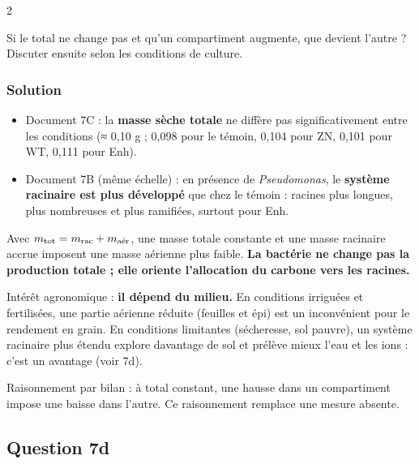 \documentclass[11pt,a4paper]{article}
\providecommand{\tightlist}{\setlength{\itemsep}{0pt}\setlength{\parskip}{0pt}}
\begin{document}
\begin{indication}{2}

Si le total ne change pas et qu'un compartiment augmente, que devient l'autre ? Discuter ensuite selon les conditions de culture.

\end{indication}

\hypertarget{solution-17}{%
\subsubsection{Solution}\label{solution-17}}

\begin{itemize}
\tightlist
\item
  Document 7C : la \textbf{masse sèche totale} ne diffère pas significativement entre les conditions (≈ 0,10 g ; 0,098 pour le témoin, 0,104 pour ZN, 0,101 pour WT, 0,111 pour Enh).
\item
  Document 7B (même échelle) : en présence de \emph{Pseudomonas}, le \textbf{système racinaire est plus développé} que chez le témoin : racines plus longues, plus nombreuses et plus ramifiées, surtout pour Enh.
\end{itemize}

Avec \(m_{\text{tot}}=m_{\text{rac}}+m_{\text{\text{aér}}}\), une masse totale constante et une masse racinaire accrue imposent une masse aérienne plus faible. \textbf{La bactérie ne change pas la production totale ; elle oriente l'allocation du carbone vers les racines.}

Intérêt agronomique : \textbf{il dépend du milieu.} En conditions irriguées et fertilisées, une partie aérienne réduite (feuilles et épi) est un inconvénient pour le rendement en grain. En conditions limitantes (sécheresse, sol pauvre), un système racinaire plus étendu explore davantage de sol et prélève mieux l'eau et les ions : c'est un avantage (voir 7d).

\begin{methode}

Raisonnement par bilan : à total constant, une hausse dans un compartiment impose une baisse dans l'autre. Ce raisonnement remplace une mesure absente.

\end{methode}

\hypertarget{question-7d}{%
\subsection{Question 7d}\label{question-7d}}
\end{document}
